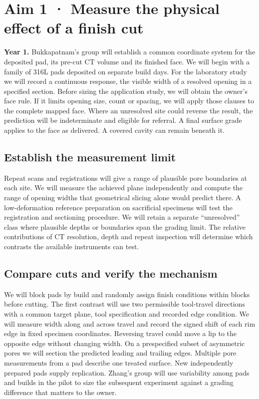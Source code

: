 \documentclass[11pt,letterpaper]{article}
\begin{document}
\newpage

\section*{Aim 1 · Measure the physical effect of a finish cut}

\textbf{Year 1.} Bukkapatnam’s group will establish a common coordinate system for the deposited pad, its pre-cut CT volume and its finished face. We will begin with a family of 316L pads deposited on separate build days. For the laboratory study we will record a continuous response, the visible width of a resolved opening in a specified section. Before sizing the application study, we will obtain the owner’s face rule. If it limits opening size, count or spacing, we will apply those clauses to the complete mapped face. Where an unresolved site could reverse the result, the prediction will be indeterminate and eligible for referral. A final surface grade applies to the face as delivered. A covered cavity can remain beneath it.

\subsection*{Establish the measurement limit}

Repeat scans and registrations will give a range of plausible pore boundaries at each site. We will measure the achieved plane independently and compute the range of opening widths that geometrical slicing alone would predict there. A low-deformation reference preparation on sacrificial specimens will test the registration and sectioning procedure. We will retain a separate “unresolved” class where plausible depths or boundaries span the grading limit. The relative contributions of CT resolution, depth and repeat inspection will determine which contrasts the available instruments can test.

\subsection*{Compare cuts and verify the mechanism}

We will block pads by build and randomly assign finish conditions within blocks before cutting. The first contrast will use two permissible tool-travel directions with a common target plane, tool specification and recorded edge condition. We will measure width along and across travel and record the signed shift of each rim edge in fixed specimen coordinates. Reversing travel could move a lip to the opposite edge without changing width. On a prespecified subset of asymmetric pores we will section the predicted leading and trailing edges. Multiple pore measurements from a pad describe one treated surface. New independently prepared pads supply replication. Zhang’s group will use variability among pads and builds in the pilot to size the subsequent experiment against a grading difference that matters to the owner.
\end{document}

